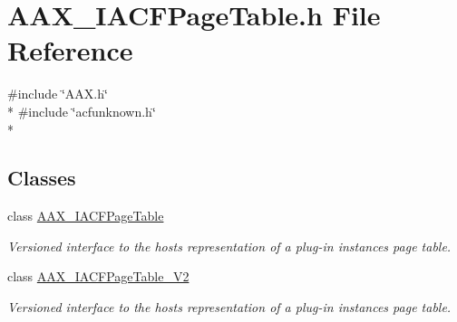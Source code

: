 \hypertarget{a00229}{}\section{A\+A\+X\+\_\+\+I\+A\+C\+F\+Page\+Table.\+h File Reference}
\label{a00229}
{\ttfamily \#include \char`\"{}A\+A\+X.\+h\char`\"{}}\\*
{\ttfamily \#include \char`\"{}acfunknown.\+h\char`\"{}}\\*
\subsection*{Classes}
\begin{DoxyCompactItemize}
\item 
class \hyperlink{a00074}{A\+A\+X\+\_\+\+I\+A\+C\+F\+Page\+Table}
\begin{DoxyCompactList}\small\item\em Versioned interface to the host\textquotesingle{}s representation of a plug-\/in instance\textquotesingle{}s page table. \end{DoxyCompactList}\item 
class \hyperlink{a00075}{A\+A\+X\+\_\+\+I\+A\+C\+F\+Page\+Table\+\_\+\+V2}
\begin{DoxyCompactList}\small\item\em Versioned interface to the host\textquotesingle{}s representation of a plug-\/in instance\textquotesingle{}s page table. \end{DoxyCompactList}\end{DoxyCompactItemize}
